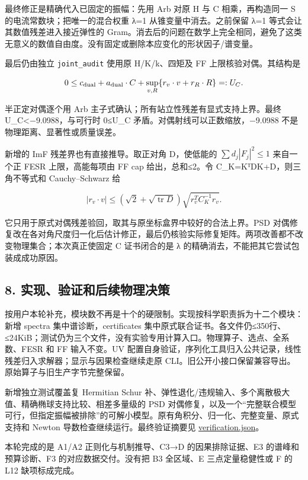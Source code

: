 \documentclass[
  11pt,
  a4paper,
]{article}
\begin{document}
最终修正是精确代入已固定的振幅：先用 Arb 对原 H 与 C 相乘，再构造同一 S
的电流常数块；把唯一的混合权重 λ=1 从锥变量中消去。之前保留 λ=1
等式会让其数值残差进入接近弹性的
Gram。消去后的问题在数学上完全相同，避免了这类无意义的数值自由度。没有固定或删除本应变化的形状因子/谱变量。

最后仍由独立 \texttt{joint\_audit} 使用原 H/K/k、四矩及 FF
上限核验对偶。其结构是

\[
0\le c_{\rm dual}+a_{\rm dual}\cdot C+
\sup_{v,R}\{r_v\cdot v+r_R\cdot R\}=:U_C.
\]

半正定对偶逐个用 Arb 主子式确认；所有站立性残差有显式支持上界。最终
U\_C\textless−9.0988，与可行时 0≤U\_C
矛盾。对偶射线可以正数缩放，−9.0988 不是物理距离、显著性或质量误差。

新增的 ImF 残差界也有直接推导。取正对角 D，使低能的
\(\sum d_j|F_j|^2\le1\) 来自一个正 FESR 上限，高能每项由 FF cap
给出，总和≤2。令 C\_K=KᵀDK+D，则三角不等式和 Cauchy--Schwarz 给

\[
|r_v\cdot v|\le(\sqrt2+\sqrt{\operatorname{tr}D})
\sqrt{r_v^T C_K^{-1}r_v}.
\tag{8}
\]

它只用于原式对偶残差验回，取其与原坐标盒界中较好的合法上界。PSD
对偶修复改在各对角尺度归一化后估计修正，最后仍核验实际修复矩阵。两项改善都不改变物理集合；本次真正使固定
C 证书闭合的是 λ 的精确消去，不能把其它尝试包装成成功原因。

\subsection{8.
实现、验证和后续物理决策}\label{ux5b9eux73b0ux9a8cux8bc1ux548cux540eux7eedux7269ux7406ux51b3ux7b56}

按用户本轮补充，模块数不再是十个的硬限制。实现按科学职责拆为十二个模块：新增
spectra 集中谱诊断，certificates
集中原式联合证书。各文件仍≤350行、≤24KiB；测试仍为三个文件，没有实验专用计算入口。物理算子、选点、全系数、FESR
和 FF 输入不变。UV
配置自身验证，序列化工具归入公共记录，线性残差归入求解器；显示与因果检查继续走原
CLI。旧公开小接口保留兼容导出。原始算子与旧生产字节完整保留。

新增独立测试覆盖复 Hermitian Schur
补、弹性退化/违规输入、多个离散极大值、精确椭球支持比较、相差多量级的
PSD
对偶修复，以及一个``完整联合模型可行，但指定振幅被排除''的可解小模型。原有角积分、归一化、完整变量、原式支持和
Newton 导数检查继续运行。最终验证摘要见 \url{verification.json}。

本轮完成的是 A1/A2 正则化与机制推导、C3→D 的因果排除证据、E3
的谱峰和预算诊断、F3 的对应数据交付。没有把 B3 全区域、E
三点定量稳健性或 F 的 L12 缺项标成完成。
\end{document}
